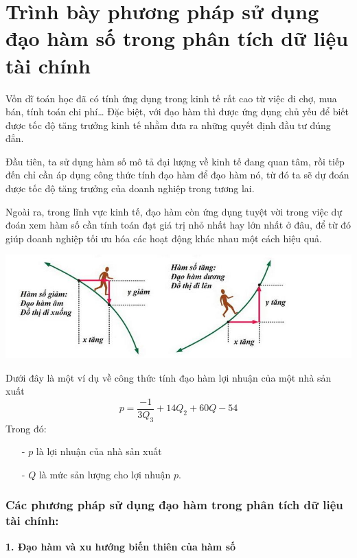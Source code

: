 \documentclass[12pt,a4paper]{report}
\begin{document}
\section{Trình bày phương pháp sử dụng đạo hàm số trong phân tích dữ liệu tài chính}
Vốn dĩ toán học đã có tính ứng dụng trong kinh tế rất cao từ việc đi chợ, mua bán, tính toán chi phí… Đặc biệt, với đạo hàm thì được ứng dụng chủ yếu để biết được tốc độ tăng trưởng kinh tế nhằm đưa ra những quyết định đầu tư đúng đắn.

Đầu tiên, ta sử dụng hàm số mô tả đại lượng về kinh tế đang quan tâm, rồi tiếp đến chỉ cần áp dụng công thức tính đạo hàm để đạo hàm nó, từ đó ta sẽ dự đoán được tốc độ tăng trưởng của doanh nghiệp trong tương lai.

Ngoài ra, trong lĩnh vực kinh tế, đạo hàm còn ứng dụng tuyệt vời trong việc dự đoán xem hàm số cần tính toán đạt giá trị nhỏ nhất hay lớn nhất ở đâu, để từ đó giúp doanh nghiệp tối ưu hóa các hoạt động khác nhau một cách hiệu quả.
\begin{center}
    \includegraphics*[scale = 0.55]{2.png}
\end{center}

Dưới đây là một ví dụ về công thức tính đạo hàm lợi nhuận của một nhà sản xuất
\[
    p = \frac{-1}{3Q_3} + 14Q_2 + 60Q - 54    
\]
\newpage
Trong đó:
\begin{itemize}
    \item[-] $p$ là lợi nhuận của nhà sản xuất
    \item[-] $Q$ là mức sản lượng cho lợi nhuận $p$.
\end{itemize}
\subsubsection{Các phương pháp sử dụng đạo hàm trong phân tích dữ liệu tài chính:}
\textbf{1. Đạo hàm và xu hướng biến thiên của hàm số}
\end{document}
